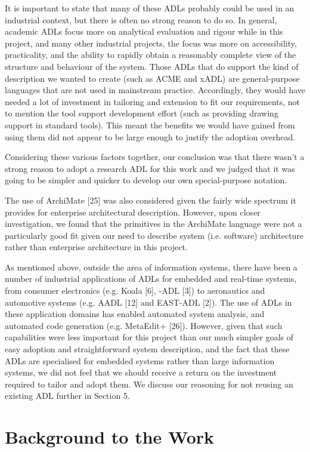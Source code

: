   It is important to state that many of these ADLs probably could be used in an industrial context, but there is often no strong reason to do so. In general, academic ADLs focus more on analytical evaluation and rigour while in this project, and many other industrial projects, the focus was more on accessibility, practicality, and the ability to rapidly obtain a reasonably complete view of the structure and behaviour of the system. Those ADLs that do support the kind of description we wanted to create (such as ACME and xADL) are general-purpose languages that are not used in mainstream practice. Accordingly, they would have needed a lot of investment in tailoring and extension to fit our requirements, not to mention the tool support development effort (such as providing drawing support in standard tools).  This meant the benefits we would have gained from using them did not appear to be large enough to justify the adoption overhead.

  Considering these various factors together, our conclusion was that there wasn't a strong reason to adopt a research ADL for this work and we judged that it was going to be simpler and quicker to develop our own special-purpose notation.

  The use of ArchiMate [25] was also considered given the fairly wide spectrum it provides for enterprise architectural description. However, upon closer investigation, we found that the primitives in the ArchiMate language were not a particularly good fit given our need to describe system (i.e. software) architecture rather than enterprise architecture in this project. 

  As mentioned above, outside the area of information systems, there have been a number of industrial applications of ADLs for embedded and real-time systems, from consumer electronics (e.g. Koala [6], \pi-ADL [3]) to aeronautics and automotive systems (e.g. AADL [12] and EAST-ADL [2]). The use of ADLs in these application domains has enabled automated system analysis, and automated code generation (e.g. MetaEdit+ [26]). However, given that such capabilities were less important for this project than our much simpler goals of easy adoption and straightforward system description, and the fact that these ADLs are specialised for embedded systems rather than large information systems, we did not feel that we should receive a return on the investment required to tailor and adopt them.  We discuss our reasoning for not reusing an existing ADL further in Section 5.

\section{Background to the Work}

